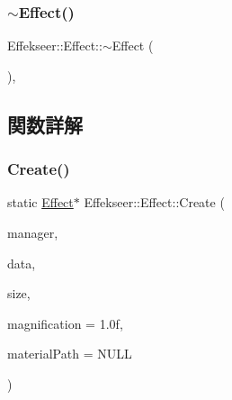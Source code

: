 \mbox{\label{class_effekseer_1_1_effect_a1548bfc590a25a1515dbbb2d5923b7be}} 
\subsubsection{\texorpdfstring{$\sim$\+Effect()}{~Effect()}}
{\footnotesize\ttfamily Effekseer\+::\+Effect\+::$\sim$\+Effect (\begin{DoxyParamCaption}{ }\end{DoxyParamCaption})\hspace{0.3cm}{\ttfamily [inline]}, {\ttfamily [protected]}}



\subsection{関数詳解}
\mbox{\label{class_effekseer_1_1_effect_a405ce55b658846f21963f39d8f4bda12}} 
\subsubsection{\texorpdfstring{Create()}{Create()}\hspace{0.1cm}{\footnotesize\ttfamily [1/4]}}
{\footnotesize\ttfamily static \mbox{\hyperlink{class_effekseer_1_1_effect}{Effect}}$\ast$ Effekseer\+::\+Effect\+::\+Create (\begin{DoxyParamCaption}\item[{\mbox{\hyperlink{class_effekseer_1_1_manager}{Manager}} $\ast$}]{manager,  }\item[{\mbox{\hyperlink{namespace_effekseer_ab34c4088e512200cf4c2716f168deb56}{void}} $\ast$}]{data,  }\item[{int32\+\_\+t}]{size,  }\item[{float}]{magnification = {\ttfamily 1.0f},  }\item[{const \mbox{\hyperlink{_effekseer_8h_aca7eb5de6dd019c19ac58ea35a193f2f}{E\+F\+K\+\_\+\+C\+H\+AR}} $\ast$}]{material\+Path = {\ttfamily NULL} }\end{DoxyParamCaption})\hspace{0.3cm}{\ttfamily [static]}}



